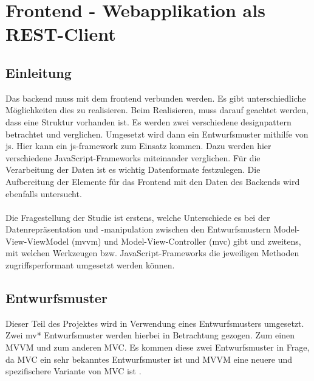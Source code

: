 
\section{Frontend - Webapplikation als REST-Client}
\subsection{Einleitung}
Das \Gls{backend} muss mit dem \Gls{frontend} verbunden werden. Es gibt unterschiedliche Möglichkeiten dies zu realisieren. Beim Realisieren, muss darauf geachtet werden, dass eine Struktur vorhanden ist. Es werden zwei verschiedene \Gls{designpattern} betrachtet und verglichen. Umgesetzt wird dann ein Entwurfsmuster mithilfe von \Gls{js}. Hier kann ein \Gls{js}-\Gls{framework} zum Einsatz kommen. Dazu werden hier verschiedene JavaScript-Frameworks miteinander verglichen. Für die Verarbeitung der Daten ist es wichtig Datenformate festzulegen. Die Aufbereitung der Elemente für das Frontend mit den Daten des Backends wird ebenfalls untersucht.
\\\\
Die Fragestellung der Studie ist erstens, welche Unterschiede es bei der Datenrepräsentation und -manipulation zwischen den Entwurfsmustern Model-View-ViewModel (\Gls{mvvm}) und Model-View-Controller (\Gls{mvc}) gibt und zweitens, mit welchen Werkzeugen bzw. JavaScript-Frameworks die jeweiligen Methoden zugriffsperformant umgesetzt werden können.
\subsection{Entwurfsmuster}
Dieser Teil des Projektes wird in Verwendung eines Entwurfsmusters umgesetzt. Zwei \Gls{mv*} Entwurfsmuster werden hierbei in Betrachtung gezogen. Zum einen MVVM und zum anderen MVC. Es kommen diese zwei Entwurfsmuster in Frage, da MVC ein sehr bekanntes Entwurfsmuster ist und MVVM eine neuere und spezifischere Variante von MVC ist \cite{mvvm_vue}.
